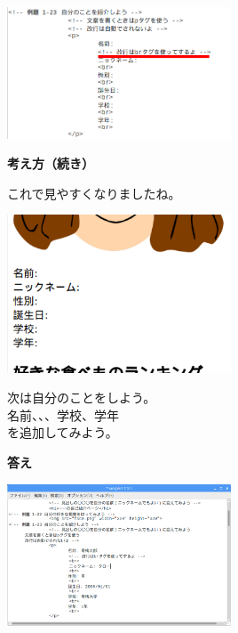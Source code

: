\includegraphics[width=0.5\textwidth]{text01-img/textbook-img174.png}

\clearpage


\flushleft

\textbf{考え方（続き）}


これで見やすくなりましたね。

\bigskip


\includegraphics[width=0.5\textwidth]{text01-img/textbook-img176.png}

\bigskip

次は自分のことをしよう。\\
名前、、、学校、学年\\
を追加してみよう。



\bigskip

\bigskip


\textbf{答え}


\bigskip

\includegraphics[width=0.5\textwidth]{text01-img/textbook-img177.png}



\bigskip


